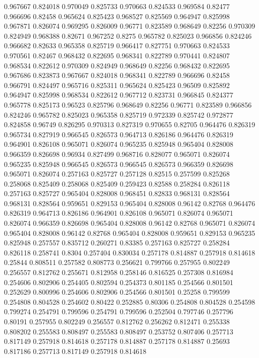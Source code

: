 0.967667 0.824018
0.970049 0.825733
0.970663 0.824533
0.969584 0.82477
0.966696 0.82458
0.965624 0.825423
0.968527 0.825569
0.964947 0.825998
0.967871 0.826074
0.969295 0.826009
0.96771 0.823589
0.968649 0.82256
0.970309 0.824949
0.968388 0.82671
0.967252 0.8275
0.965782 0.825023
0.966856 0.824246
0.966682 0.82633
0.965358 0.825719
0.966417 0.827751
0.970663 0.824533
0.970561 0.82467
0.968432 0.822695
0.968341 0.822789
0.970441 0.824807
0.968534 0.822612
0.970309 0.824949
0.968649 0.82256
0.968432 0.822695
0.967686 0.823873
0.967667 0.824018
0.968341 0.822789
0.966696 0.82458
0.966791 0.824497
0.965716 0.825311
0.965624 0.825423
0.96509 0.825892
0.964947 0.825998
0.968534 0.822612
0.967712 0.823731
0.966845 0.824377
0.965778 0.825173
0.96523 0.825796
0.968649 0.82256
0.96771 0.823589
0.966856 0.824246
0.965782 0.825023
0.965358 0.825719
0.972339 0.825742
0.972877 0.824858
0.96749 0.826295
0.970313 0.827319
0.970655 0.82705
0.964476 0.826319
0.965734 0.827919
0.966545 0.826573
0.964713 0.826186
0.964476 0.826319
0.964901 0.826108
0.965071 0.826074
0.965235 0.825948
0.965404 0.828008
0.966359 0.826698
0.96934 0.827499
0.968716 0.828077
0.965071 0.826074
0.965235 0.825948
0.966545 0.826573
0.966545 0.826573
0.966359 0.826698
0.965071 0.826074
0.257163 0.825727
0.257128 0.82515
0.257599 0.825268
0.258068 0.825409
0.258068 0.825409
0.259423 0.82588
0.258284 0.826118
0.257163 0.825727
0.965404 0.828008
0.968451 0.82833
0.968131 0.828564
0.968131 0.828564
0.959651 0.829153
0.965404 0.828008
0.96142 0.82768
0.964476 0.826319
0.964713 0.826186
0.964901 0.826108
0.965071 0.826074
0.965071 0.826074
0.966359 0.826698
0.965404 0.828008
0.96142 0.82768
0.965071 0.826074
0.965404 0.828008
0.96142 0.82768
0.965404 0.828008
0.959651 0.829153
0.965235 0.825948
0.257557 0.835712
0.260271 0.83385
0.257163 0.825727
0.258284 0.826118
0.258741 0.8304
0.257404 0.830034
0.257178 0.814887
0.257918 0.814618
0.25844 0.808511
0.257582 0.808773
0.256621 0.799766
0.257955 0.802249
0.256557 0.812762
0.255671 0.812958
0.258146 0.816525
0.257308 0.816984
0.254606 0.802906
0.254405 0.802594
0.254373 0.801185
0.254566 0.801501
0.252629 0.800996
0.254606 0.802906
0.254566 0.801501
0.25258 0.799599
0.254808 0.804528
0.254602 0.80422
0.252885 0.80306
0.254808 0.804528
0.254598 0.799274
0.254791 0.799596
0.254791 0.799596
0.252504 0.797746
0.257796 0.80191
0.257955 0.802249
0.256557 0.812762
0.256262 0.812471
0.255338 0.808202
0.255583 0.808497
0.255583 0.808497
0.253752 0.807406
0.257713 0.817149
0.257918 0.814618
0.257178 0.814887
0.257178 0.814887
0.25693 0.817186
0.257713 0.817149
0.257918 0.814618
